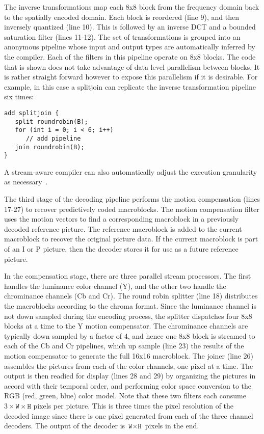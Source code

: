 The inverse transformations map each 8x8 block from the frequency
domain back to the spatially encoded domain. Each block is reordered
(line 9), and then inversely quantized (line 10). This is followed by
an inverse DCT and a bounded saturation filter (lines 11-12). The set
of transformations is grouped into an anonymous pipeline whose input
and output types are automatically inferred by the compiler. Each of
the filters in this pipeline operate on 8x8 blocks. The code that is
shown does not take advantage of data level parallelism between
blocks. It is rather straight forward however to expose this
parallelism if it is desirable. For example, in this case a splitjoin
can replicate the inverse transformation pipeline six times:
\begin{center}
\begin{verbatim}
add splitjoin {
   split roundrobin(B);
   for (int i = 0; i < 6; i++) 
      // add pipeline
   join roundrobin(B);
}
\end{verbatim}
\end{center}
A stream-aware compiler can also automatically adjust the execution
granularity as necessary~\cite{gordo-asplos}.

The third stage of the decoding pipeline performs the motion
compensation (lines 17-27) to recover predictively coded
macroblocks. The motion compensation filter uses the motion vectors to
find a corresponding macroblock in a previously decoded reference
picture. The reference macroblock is added to the current macroblock
to recover the original picture data. If the current macroblock is
part of an I or P picture, then the decoder stores it for use as a
future reference picture.

In the compensation stage, there are three parallel stream
processors. The first handles the luminance color channel (Y), and the
other two handle the chrominance channels (Cb and Cr). The round robin
splitter (line 18) distributes the macroblocks according to the chroma
format. Since the luminance channel is not down sampled during the
encoding process, the splitter dispatches four 8x8 blocks at a time to
the Y motion compensator. The chrominance channels are typically down
sampled by a factor of 4, and hence one 8x8 block is streamed to each
of the Cb and Cr pipelines, which up sample (line 23) the results of
the motion compensator to generate the full 16x16 macroblock.  The
joiner (line 26) assembles the pictures from each of the color
channels, one pixel at a time. The output is then readied for display
(lines 28 and 29) by organizing the pictures in accord with their
temporal order, and performing color space conversion to the RGB (red,
green, blue) color model. Note that these two filters each consume
$3\times\texttt{W}\times\texttt{H}$ pixels per picture. This is three
times the pixel resolution of the decoded image since there is one
pixel generated from each of the three channel decoders. The output of
the decoder is $\texttt{W}\times\texttt{H}$ pixels in the end.

